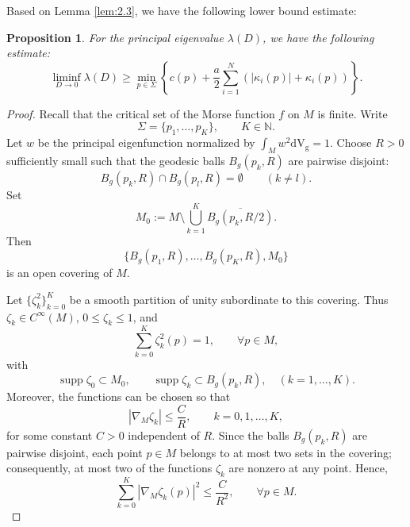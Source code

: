 \documentclass[12pt,reqno]{amsart}
\newtheorem{proposition}{Proposition}[section]
\newcommand{\V}{\mathrm{d} \mathrm{V_g}}
\numberwithin{equation}{section}
\begin{document}
 Based on Lemma \ref{lem:2.3}, we have the following lower bound estimate:
\begin{proposition}\label{prop:lower} 
For the principal eigenvalue $\lambda(D)$, we have the following estimate:
\[
\liminf_{D \to 0} \lambda(D) \geq \min_{p \in \Sigma} \left\{ c(p) + \frac{a}{2} \sum_{i=1}^N \left( |\kappa_i(p)| + \kappa_i(p) \right) \right\}.
\]
\end{proposition}


\begin{proof}
Recall that the critical set of the Morse function \(f\) on \(M\) is finite. Write
\[
\Sigma=\{p_1,\ldots,p_K\}, \qquad K\in\mathbb N.
\]
Let \(w\) be the principal eigenfunction normalized by \(\int_M w^2 \V=1\). Choose \(R>0\) sufficiently small such that the geodesic balls \(B_g(p_k,R)\) are pairwise disjoint:
\[
B_g(p_k,R)\cap B_g(p_l,R)=\emptyset \qquad (k\neq l).
\]
Set
\[
M_0:=M\setminus \bigcup_{k=1}^K \overline{B_g(p_k,R/2)} .
\]
Then
\[
\{B_g(p_1,R),\ldots,B_g(p_K,R),M_0\}
\]
is an open covering of \(M\).

Let
$\{\zeta_k^2\}_{k=0}^K$
be a smooth partition of unity subordinate to this covering. Thus
\(\zeta_k\in C^\infty(M)\), \(0\leq \zeta_k\leq 1\), and
\[
\sum_{k=0}^K \zeta_k^2(p)=1,
\qquad \forall p\in M,
\]
with
\[
\operatorname{supp} \zeta_0\subset M_0,
\qquad
\operatorname{supp} \zeta_k\subset B_g(p_k,R),
\quad (k=1,\ldots,K).
\]
Moreover, the functions can be chosen so that
\[
|\nabla_M\zeta_k|\leq \frac{C}{R},
\qquad k=0,1,\ldots,K,
\]
for some constant \(C>0\) independent of \(R\).  Since the balls \(B_g(p_k,R)\) are pairwise disjoint, each point \(p\in M\) belongs to at most two sets in the covering; consequently, at most two of the functions \(\zeta_k\) are nonzero at any point. Hence,
\begin{equation}\label{gradient bound}
\sum_{k=0}^K|\nabla_M\zeta_k(p)|^2
\leq\frac{C}{R^2},
\qquad \forall p\in M.
\end{equation}



\end{proof}
\end{document}

